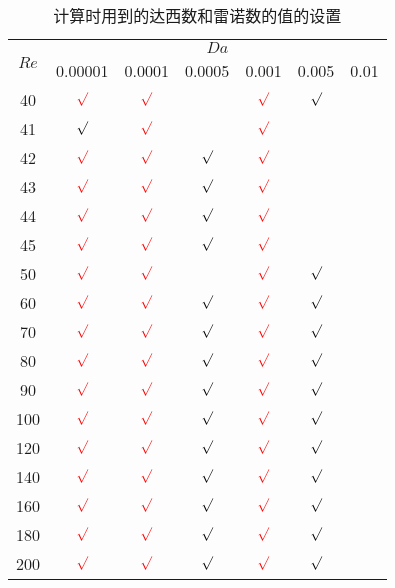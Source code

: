 \begin{table}
	\caption{计算时用到的达西数和雷诺数的值的设置}\label{tab: DaRe}
	\vspace{.5em}\centering\wuhao
	\begin{tabular}{*{7}{c}}
		\toprule[1.5pt]
		\multirow{2}[3]{*}{$Re$} & \multicolumn{6}{c}{$Da$} \\
		\cmidrule[.67pt](lr){2-7}
		& 0.00001 & 0.0001 & 0.0005 & 0.001 & 0.005 & 0.01 \\
		\midrule[1pt]
		40  & ${\color{red}\surd}$ & ${\color{red}\surd}$ &         & ${\color{red}\surd}$ & $\surd$ \\
		41  & $\surd$              & ${\color{red}\surd}$ &         & ${\color{red}\surd}$ &   \\
		42  & ${\color{red}\surd}$ & ${\color{red}\surd}$ & $\surd$ & ${\color{red}\surd}$ &   \\
		43  & ${\color{red}\surd}$ & ${\color{red}\surd}$ & $\surd$ & ${\color{red}\surd}$ &   \\
		44  & ${\color{red}\surd}$ & ${\color{red}\surd}$ & $\surd$ & ${\color{red}\surd}$ &   \\
		45  & ${\color{red}\surd}$ & ${\color{red}\surd}$ & $\surd$ & ${\color{red}\surd}$ &   \\
		50  & ${\color{red}\surd}$ & ${\color{red}\surd}$ &         & ${\color{red}\surd}$ & $\surd$ \\
		60  & ${\color{red}\surd}$ & ${\color{red}\surd}$ & $\surd$ & ${\color{red}\surd}$ & $\surd$ \\
		70  & ${\color{red}\surd}$ & ${\color{red}\surd}$ & $\surd$ & ${\color{red}\surd}$ & $\surd$ \\
		80  & ${\color{red}\surd}$ & ${\color{red}\surd}$ & $\surd$ & ${\color{red}\surd}$ & $\surd$ \\
		90  & ${\color{red}\surd}$ & ${\color{red}\surd}$ & $\surd$ & ${\color{red}\surd}$ & $\surd$ \\
		100 & ${\color{red}\surd}$ & ${\color{red}\surd}$ & $\surd$ & ${\color{red}\surd}$ & $\surd$ \\
		120 & ${\color{red}\surd}$ & ${\color{red}\surd}$ & $\surd$ & ${\color{red}\surd}$ & $\surd$ \\
		140 & ${\color{red}\surd}$ & ${\color{red}\surd}$ & $\surd$ & ${\color{red}\surd}$ & $\surd$ \\
		160 & ${\color{red}\surd}$ & ${\color{red}\surd}$ & $\surd$ & ${\color{red}\surd}$ & $\surd$ \\
		180 & ${\color{red}\surd}$ & ${\color{red}\surd}$ & $\surd$ & ${\color{red}\surd}$ & $\surd$ \\
		200 & ${\color{red}\surd}$ & ${\color{red}\surd}$ & $\surd$ & ${\color{red}\surd}$ & $\surd$ \\
		\bottomrule[1.5pt]
	\end{tabular}
\end{table}

